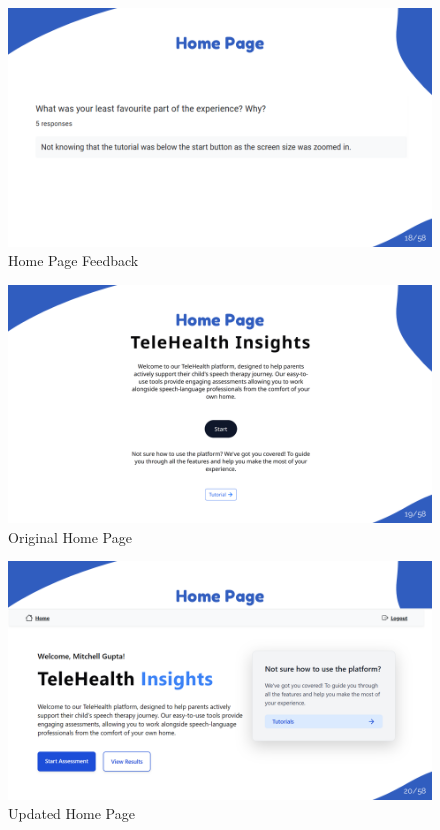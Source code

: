 \documentclass{article}
\begin{document}
\begin{figure}[H]

  \centering
  \includegraphics[width=\textwidth]{images/slide18.png}
  \caption{Home Page Feedback}
  \label{fig:home_feedback}
\end{figure}

\begin{figure}[H]
  \centering
  \includegraphics[width=\textwidth]{images/slide19.png}
  \caption{Original Home Page}
  \label{fig:home_original}
\end{figure}

\begin{figure}[H]
  \centering
  \includegraphics[width=\textwidth]{images/slide20.png}
  \caption{Updated Home Page}
  \label{fig:home_new}
\end{figure}
\end{document}
